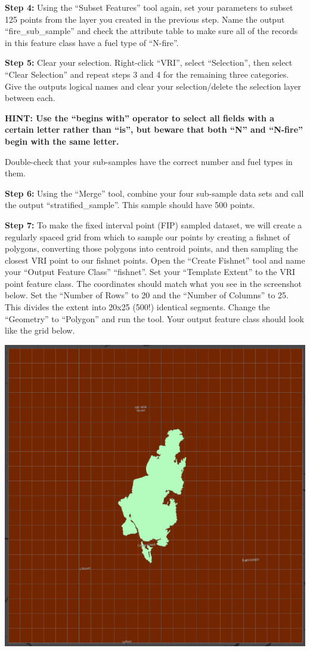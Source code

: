 \documentclass[
]{book}
\begin{document}
\textbf{Step 4:} Using the ``Subset Features'' tool again, set your parameters to subset 125 points from the layer you created in the previous step. Name the output ``fire\_sub\_sample'' and check the attribute table to make sure all of the records in this feature class have a fuel type of ``N-fire''.

\textbf{Step 5:} Clear your selection. Right-click ``VRI'', select ``Selection'', then select ``Clear Selection'' and repeat steps 3 and 4 for the remaining three categories. Give the outputs logical names and clear your selection/delete the selection layer between each.

\textbf{HINT: Use the ``begins with'' operator to select all fields with a certain letter rather than ``is'', but beware that both ``N'' and ``N-fire'' begin with the same letter.}

Double-check that your sub-samples have the correct number and fuel types in them.

\textbf{Step 6:} Using the ``Merge'' tool, combine your four sub-sample data sets and call the output ``stratified\_sample''. This sample should have 500 points.

\textbf{Step 7:} To make the fixed interval point (FIP) sampled dataset, we will create a regularly spaced grid from which to sample our points by creating a fishnet of polygons, converting those polygons into centroid points, and then sampling the closest VRI point to our fishnet points. Open the ``Create Fishnet'' tool and name your ``Output Feature Class'' ``fishnet''. Set your ``Template Extent'' to the VRI point feature class. The coordinates should match what you see in the screenshot below. Set the ``Number of Rows'' to 20 and the ``Number of Columns'' to 25. This divides the extent into 20x25 (500!) identical segments. Change the ``Geometry'' to ``Polygon'' and run the tool. Your output feature class should look like the grid below.

\includegraphics[width=0.75\linewidth]{images/04-elephant-hill-fishnet}
\end{document}

